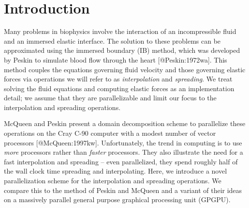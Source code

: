\section{Introduction}

Many problems in biophysics involve the interaction of an incompressible fluid
and an immersed elastic interface. The solution to these problems can be
approximated using the immersed boundary (IB) method, which was developed by
Peskin to simulate blood flow through the heart [@Peskin:1972wa]. This method
couples the equations governing fluid velocity and those governing elastic
forces via operations we will refer to as \textit{interpolation} and
\textit{spreading}. We treat solving the fluid equations and computing elastic
forces as an implementation detail; we assume that they are parallelizable and
limit our focus to the interpolation and spreading operations.

McQueen and Peskin present a domain decomposition scheme to parallelize these
operations on the Cray C-90 computer with a modest number of vector processors
[@McQueen:1997kw]. Unfortunately, the trend in computing is to use \emph{more}
processors rather than \emph{faster} processors. They also illustrate the need
for a fast interpolation and spreading -- even parallelized, they spend roughly
half of the wall clock time spreading and interpolating. Here, we introduce
a novel parallelization scheme for the interpolation and spreading operations.
We compare this to the method of Peskin and McQueen and a variant of their
ideas on a massively parallel general purpose graphical processing unit
(GPGPU).
